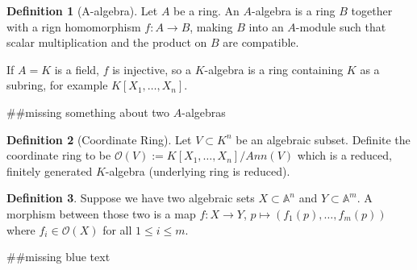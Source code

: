\documentclass[a4paper]{book}
\theoremstyle{definition}
\newtheorem{definition}{Definition}[]
\begin{document}
\begin{defbox}
    \begin{definition}[A-algebra]
        Let \(A\) be a ring. An \(A\)-algebra is a ring \(B\) together with a rign homomorphism \(f: A \longrightarrow B\), making \(B\) into an \(A\)-module such that scalar multiplication and the product on \(B\) are compatible.

        If \(A = K\) is a field, \(f\) is injective, so a \(K\)-algebra is a ring containing \(K\) as a subring, for example \(K[X_1, \ldots, X_n]\).

        \#\#missing something about two \(A\)-algebras
    \end{definition}
\end{defbox}

\begin{defbox}
    \begin{definition}[Coordinate Ring]
        Let \(V \subset K^n\) be an algebraic subset. Definite the coordinate ring to be \(\mathcal{O}(V) := K[X_1, \ldots, X_n] / Ann(V)\) which is a reduced, finitely generated \(K\)-algebra (underlying ring is reduced).
    \end{definition}
\end{defbox}

\begin{defbox}
    \begin{definition}
        Suppose we have two algebraic sets \(X \subset \mathbb{A}^n\) and \(Y \subset \mathbb{A}^m\). A morphism between those two is a map \(f: X \longrightarrow Y\), \(p \mapsto (f_1(p), \ldots, f_m(p))\) where \(f_i \in \mathcal{O}(X)\) for all \(1 \leq i \leq m\).
    \end{definition}
\end{defbox}

\#\#missing blue text
\end{document}

